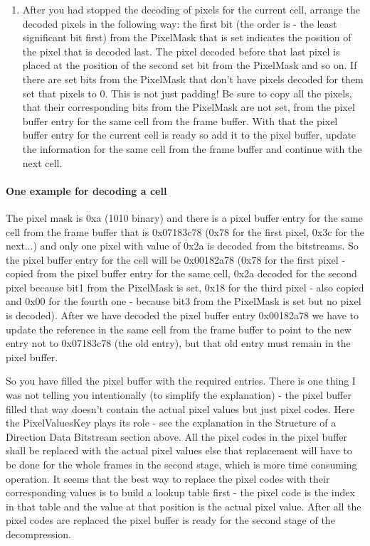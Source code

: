 \begin{enumerate}
\item After you had stopped the decoding of pixels for the current cell, arrange 
the decoded pixels in the following way: the first bit (the order is - the least 
significant bit first) from the PixelMask that is set indicates the position of 
the pixel that is decoded last. The pixel decoded before that last pixel is 
placed at the position of the second set bit from the PixelMask and so on. If 
there are set bits from the PixelMask that don't have pixels decoded for them 
set that pixels to 0. This is not just padding! Be sure to copy all the pixels, 
that their corresponding bits from the PixelMask are not set, from the pixel 
buffer entry for the same cell from the frame buffer. With that the pixel buffer 
entry for the current cell is ready so add it to the pixel buffer, update the 
information for the same cell from the frame buffer and continue with the next 
cell.
\end{enumerate}

\paragraph{One example for decoding a cell}
The pixel mask is 0xa (1010 binary) and there is a pixel buffer entry for the 
same cell from the frame buffer that is 0x07183c78 (0x78 for the first pixel, 
0x3c for the next...) and only one pixel with value of 0x2a is decoded from the 
bitstreams. So the pixel buffer entry for the cell will be 0x00182a78 (0x78 for 
the first pixel - copied from the pixel buffer entry for the same cell, 0x2a 
decoded for the second pixel because bit1 from the PixelMask is set, 0x18 for 
the third pixel - also copied and 0x00 for the fourth one - because bit3 from 
the PixelMask is set but no pixel is decoded). After we have decoded the pixel 
buffer entry 0x00182a78 we have to update the reference in the same cell from 
the frame buffer to point to the new entry not to 0x07183c78 (the old entry), 
but that old entry must remain in the pixel buffer.

So you have filled the pixel buffer with the required entries. There is one 
thing I was not telling you intentionally (to simplify the explanation) - the 
pixel buffer filled that way doesn't contain the actual pixel values but just 
pixel codes. Here the PixelValuesKey plays its role - see the explanation in the 
Structure of a Direction Data Bitstream section above. All the pixel codes in 
the pixel buffer shall be replaced with the actual pixel values else that 
replacement will have to be done for the whole frames in the second stage, which 
is more time consuming operation. It seems that the best way to replace the 
pixel codes with their corresponding values is to build a lookup table first - 
the pixel code is the index in that table and the value at that position is the 
actual pixel value. After all the pixel codes are replaced the pixel buffer is 
ready for the second stage of the decompression.

